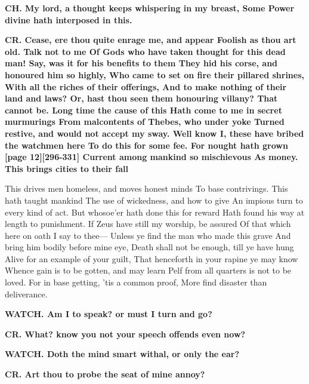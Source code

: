 \documentclass[11pt,letter]{book}
\begin{document}
\par \textbf{CH. My lord, a thought keeps whispering in my breast, Some Power divine hath interposed in this.}
\par 

\par \textbf{CR. Cease, ere thou quite enrage me, and appear Foolish as thou art old. Talk not to me Of Gods who have taken thought for this dead man! Say, was it for his benefits to them They hid his corse, and honoured him so highly, Who came to set on fire their pillared shrines, With all the riches of their offerings, And to make nothing of their land and laws? Or, hast thou seen them honouring villany? That cannot be. Long time the cause of this Hath come to me in secret murmurings From malcontents of Thebes, who under yoke Turned restive, and would not accept my sway. Well know I, these have bribed the watchmen here To do this for some fee. For nought hath grown [page 12][296-331] Current among mankind so mischievous As money. This brings cities to their fall}
\par   This drives men homeless, and moves honest minds To base contrivings. This hath taught mankind The use of wickedness, and how to give An impious turn to every kind of act. But whosoe’er hath done this for reward Hath found his way at length to punishment. If Zeus have still my worship, be assured Of that which here on oath I say to thee— Unless ye find the man who made this grave And bring him bodily before mine eye, Death shall not be enough, till ye have hung Alive for an example of your guilt, That henceforth in your rapine ye may know Whence gain is to be gotten, and may learn Pelf from all quarters is not to be loved. For in base getting, ’tis a common proof, More find disaster than deliverance.

\par \textbf{WATCH. Am I to speak? or must I turn and go?}
\par 

\par \textbf{CR. What? know you not your speech offends even now?}
\par 

\par \textbf{WATCH. Doth the mind smart withal, or only the ear?}
\par 

\par \textbf{CR. Art thou to probe the seat of mine annoy?}
\par 
\end{document}

